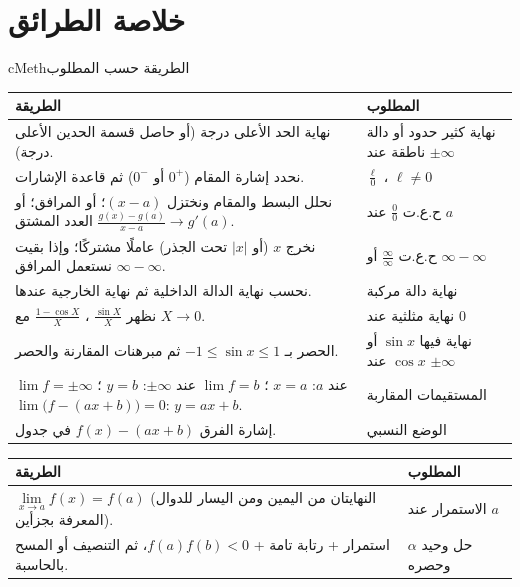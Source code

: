 \documentclass[12pt,a4paper]{article}
\newenvironment{BOX}[2]{\begin{otherlanguage}{english}\begin{arbox}{#1}{#2}}{\end{arbox}\end{otherlanguage}}
\newcommand{\Lim}[1]{\lim\limits_{#1}}
\begin{document}
\section{خلاصة الطرائق}
\begin{BOX}{cMeth}{الطريقة حسب المطلوب}
\begin{center}
\renewcommand{\arraystretch}{1.3}
\begin{tabular}{|p{}|p{}|}\hline
\rowcolor{cSec!12} \textbf{الطريقة} & \textbf{المطلوب}\\\hline
نهاية الحد الأعلى درجة (أو حاصل قسمة الحدين الأعلى درجة). & نهاية كثير حدود أو دالة ناطقة عند $\pm\infty$\\\hline
نحدد إشارة المقام ($0^{+}$ أو $0^{-}$) ثم قاعدة الإشارات. & $\frac{\ell}{0}$ ، $\ell\neq0$\\\hline
نحلل البسط والمقام ونختزل $(x-a)$؛ أو المرافق؛ أو العدد المشتق $\frac{g(x)-g(a)}{x-a}\to g'(a)$. & ح.ع.ت $\frac00$ عند $a$\\\hline
نخرج $x$ (أو $|x|$ تحت الجذر) عاملًا مشتركًا؛ وإذا بقيت $\infty-\infty$ نستعمل المرافق. & ح.ع.ت $\frac{\infty}{\infty}$ أو $\infty-\infty$\\\hline
نحسب نهاية الدالة الداخلية ثم نهاية الخارجية عندها. & نهاية دالة مركبة\\\hline
نظهر $\frac{\sin X}{X}$ ، $\frac{1-\cos X}{X}$ مع $X\to0$. & نهاية مثلثية عند $0$\\\hline
الحصر بـ $-1\leqslant\sin x\leqslant1$ ثم مبرهنات المقارنة والحصر. & نهاية فيها $\sin x$ أو $\cos x$ عند $\pm\infty$\\\hline
$\lim f=\pm\infty$ عند $a$: $x=a$ ؛ $\lim f=b$ عند $\pm\infty$: $y=b$ ؛ $\lim\big(f-(ax+b)\big)=0$: $y=ax+b$. & المستقيمات المقاربة\\\hline
إشارة الفرق $f(x)-(ax+b)$ في جدول. & الوضع النسبي\\\hline
\end{tabular}
\end{center}
\begin{center}
\renewcommand{\arraystretch}{1.3}
\begin{tabular}{|p{}|p{}|}\hline
\rowcolor{cSec!12} \textbf{الطريقة} & \textbf{المطلوب}\\\hline
$\Lim{x\to a}f(x)=f(a)$ (النهايتان من اليمين ومن اليسار للدوال المعرفة بجزأين). & الاستمرار عند $a$\\\hline
استمرار + رتابة تامة + $f(a)f(b)<0$، ثم التنصيف أو المسح بالحاسبة. & حل وحيد $\alpha$ وحصره\\\hline

\end{tabular}
\end{center}
\end{BOX}
\end{document}
